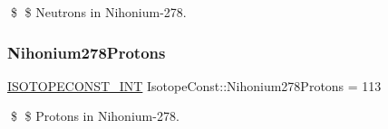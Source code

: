 \$ \$ Neutrons in Nihonium-\/278. \mbox{\label{group___isotope_const-_nihonium-_nh278_gab1b563df9b1e0a0a156e46fe78566810}} 
\subsubsection{\texorpdfstring{Nihonium278\+Protons}{Nihonium278Protons}}
{\footnotesize\ttfamily \mbox{\hyperlink{group___isotope_const-_macros_ga5f18360b3e99483a35c32d789e62621c}{I\+S\+O\+T\+O\+P\+E\+C\+O\+N\+S\+T\+\_\+\+I\+NT}} Isotope\+Const\+::\+Nihonium278\+Protons = 113}

\$ \$ Protons in Nihonium-\/278. 